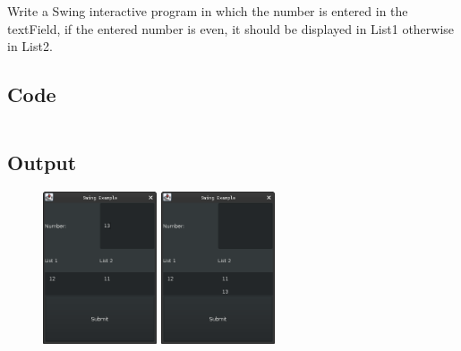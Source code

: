 \documentclass[../main.tex]{subfiles}
\begin{document}
Write a Swing interactive program in which the number is entered in the
textField, if the entered number is even, it should be displayed in List1
otherwise in List2.

\subsection{Code}
\inputminted[frame=lines, breaklines, breakanywhere, numberblanklines=false]{java}{./programs/prog12/Swing.java}

\subsection{Output}
\begin{figure}[h!]
	\centering
	\includegraphics[width=0.3\textwidth]{./assets/p12-s1.png}
	\includegraphics[width=0.3\textwidth]{./assets/p12-s2.png}
\end{figure}
\end{document}
